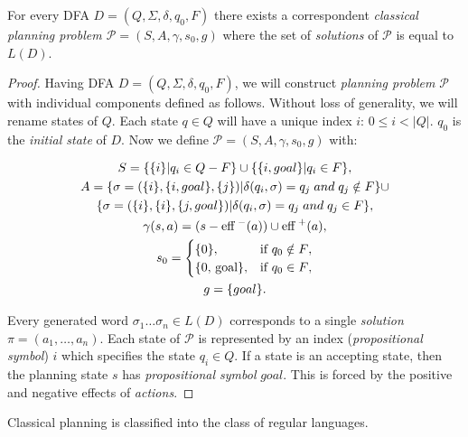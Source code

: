 \begin{thm}\label{thm02:2}
    For every DFA $D = (Q, \Sigma, \delta, q_0, F)$ there exists a correspondent \emph{classical planning problem $\mathcal{P} = (S, A, \gamma, s_0, g)$} where the set of \emph{solutions} of $\mathcal{P}$ is equal to $L(D)$.
\end{thm}
\begin{proof}
    Having DFA $D = (Q, \Sigma, \delta, q_0, F)$, we will construct \emph{planning problem} $\mathcal{P}$ with individual components defined as follows. Without loss of generality, we will rename states of $Q$. Each state $q \in Q$ will have a unique index $i$: $0 \leq i < |Q|$. $q_0$ is the \emph{initial state} of $D$. Now we define $\mathcal{P} = (S, A, \gamma, s_0, g)$ with:

    \begin{gather*}
        S = \{{\{i\} | q_i \in Q - F}\} \cup \{{\{i, goal\} | q_i \in F}\}, \\
        A = \{ \sigma = ( \{i\}, \{i, goal\}, \{j\} ) | \delta(q_i,\sigma) = q_j \; and \; q_j \notin F\} \cup \\ \{ \sigma = ( \{i\}, \{i\}, \{j, goal\} ) | \delta(q_i,\sigma) = q_j \; and \; q_j \in F\}, \\
        \gamma(s,a)=(s-\text{eff}^{\,\,-}(a)) \cup \text{eff}^{\,\,+}(a), \\
        s_0 = 
            \begin{cases}
                $\{0\}$, & \text{if $q_0 \notin F$},\\
                $\{0, goal\}$, & \text{if $q_0 \in F$},
            \end{cases} \\
        g = \{ goal \}.
    \end{gather*}

    Every generated word $\sigma_1\dots\sigma_n \in L(D)$ corresponds to a single \emph{solution} $\pi = (a_1, \dots, a_n)$. Each state of $\mathcal{P}$ is represented by an index (\emph{propositional symbol}) $i$ which specifies the state $q_i \in Q$. If a state is an accepting state, then the planning state $s$ has \emph{propositional symbol} $goal$. This is forced by the positive and negative effects of \emph{actions}.
\end{proof}

\begin{cor}\label{cor2:1}
    Classical planning is classified into the class of regular languages.
\end{cor}

